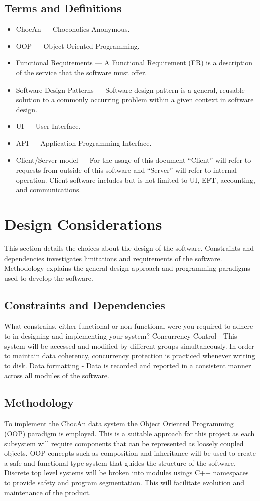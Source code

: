 \documentclass{article}
\begin{document}
\subsection{Terms and Definitions}
\begin{itemize}
   \item ChocAn --- Chocoholics Anonymous. 
   \item OOP --- Object Oriented Programming.
   \item Functional Requirements --- A Functional Requirement (FR) is a description of the service that the software must offer.
   \item Software Design Patterns --- Software design pattern is a general, reusable solution to a commonly occurring problem within a given context in software design.
   \item UI --- User Interface.
   \item API --- Application Programming Interface.
   \item Client/Server model --- For the usage of this document “Client” will refer to requests from outside of this software and “Server” will refer to internal operation. Client software includes but is not limited to UI, EFT, accounting, and communications.
\end{itemize}

\section{Design Considerations}
This section details the choices about the design of the software. Constraints and dependencies investigates limitations and requirements of the software. Methodology explains the general design approach and programming paradigms used to develop the software.

\subsection{Constraints and Dependencies}
What constrains, either functional or non-functional were you required to adhere to in designing and implementing your system?
Concurrency Control - This system will be accessed and modified by different groups simultaneously. In order to maintain data coherency, concurrency protection is practiced whenever writing to disk.
Data formatting - Data is recorded and reported in a consistent manner across all modules of the software. 

\subsection{Methodology}
To implement the ChocAn data system the Object Oriented Programming (OOP) paradigm is employed. This is a suitable approach for this project as each subsystem will require components that can be represented as loosely coupled objects. OOP concepts such as composition and inheritance will be used to create a safe and functional type system that guides the structure of the software. Discrete top level systems will be broken into modules usings C++ namespaces to provide safety and program segmentation. This will facilitate evolution and maintenance of the product.
\end{document}
